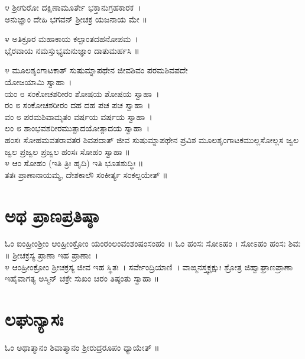 ೪ ಶ್ರೀಗುರೋ ದಕ್ಷಿಣಾಮೂರ್ತೇ ಭಕ್ತಾನುಗ್ರಹಕಾರಕ~।\\
ಅನುಜ್ಞಾಂ ದೇಹಿ ಭಗವನ್ ಶ್ರೀಚಕ್ರ ಯಜನಾಯ ಮೇ ॥

೪ ಅತಿಕ್ರೂರ ಮಹಾಕಾಯ ಕಲ್ಪಾಂತದಹನೋಪಮ~।\\
ಭೈರವಾಯ ನಮಸ್ತುಭ್ಯಮನುಜ್ಞಾಂ ದಾತುಮರ್ಹಸಿ ॥

೪ ಮೂಲಶೃಂಗಾಟಕಾತ್ ಸುಷುಮ್ನಾಪಥೇನ ಜೀವಶಿವಂ ಪರಮಶಿವಪದೇ \\ಯೋಜಯಾಮಿ ಸ್ವಾಹಾ~।\\
ಯಂ ೮ ಸಂಕೋಚಶರೀರಂ ಶೋಷಯ ಶೋಷಯ ಸ್ವಾಹಾ~।\\
ರಂ ೮ ಸಂಕೋಚಶರೀರಂ ದಹ ದಹ ಪಚ ಪಚ ಸ್ವಾಹಾ~।\\
ವಂ ೮ ಪರಮಶಿವಾಮೃತಂ ವರ್ಷಯ ವರ್ಷಯ ಸ್ವಾಹಾ~।\\
ಲಂ ೮ ಶಾಂಭವಶರೀರಮುತ್ಪಾದಯೋತ್ಪಾದಯ ಸ್ವಾಹಾ~।\\
ಹಂಸಃ ಸೋಹಮವತರಾವತರ ಶಿವಪದಾತ್ ಜೀವ ಸುಷುಮ್ನಾಪಥೇನ ಪ್ರವಿಶ ಮೂಲಶೃಂಗಾಟಕಮುಲ್ಲಸೋಲ್ಲಸ ಜ್ವಲ ಜ್ವಲ ಪ್ರಜ್ವಲ ಪ್ರಜ್ವಲ ಹಂಸಃ ಸೋಹಂ ಸ್ವಾಹಾ ॥\\
೪ ಆಂ ಸೋಹಂ (ಇತಿ ತ್ರಿಃ ಹೃದಿ) ಇತಿ ಭೂತಶುದ್ಧಿಃ ॥\\
ತತಃ ಪ್ರಾಣಾನಾಯಮ್ಯ, ದೇಶಕಾಲೌ ಸಂಕೀರ್ತ್ಯ ಸಂಕಲ್ಪಯೇತ್ ॥
\section{ಅಥ ಪ್ರಾಣಪ್ರತಿಷ್ಠಾ}
ಓಂ ಐಂಹ್ರೀಂಶ್ರೀಂ ಆಂಹ್ರೀಂಕ್ರೋಂ ಯಂರಂಲಂವಂಶಂಷಂಸಂಹಂ ॥ ಓಂ ಹಂಸಃ ಸೋಽಹಂ । ಸೋಽಹಂ ಹಂಸಃ ಶಿವಃ ॥ ಶ್ರೀಚಕ್ರಸ್ಯ  ಪ್ರಾಣಾ ಇಹ ಪ್ರಾಣಾಃ~।\\
೪ ಆಂಹ್ರೀಂಕ್ರೋಂ ಶ್ರೀಚಕ್ರಸ್ಯ ಜೀವ ಇಹ ಸ್ಥಿತಃ~। ಸರ್ವೇಂದ್ರಿಯಾಣಿ~। ವಾಙ್ಮನಸ್ತ್ವಕ್ಚಕ್ಷುಃ ಶ್ರೋತ್ರ ಜಿಹ್ವಾಘ್ರಾಣಪ್ರಾಣಾ ಇಹೈವಾಗತ್ಯ  ಅಸ್ಮಿನ್ ಚಕ್ರೇ ಸುಖಂ ಚಿರಂ ತಿಷ್ಠಂತು ಸ್ವಾಹಾ ॥
\section{ಲಘುನ್ಯಾಸಃ}
ಓಂ ಅಥಾತ್ಮಾನಂ ಶಿವಾತ್ಮಾನಂ ಶ್ರೀರುದ್ರರೂಪಂ ಧ್ಯಾಯೇತ್ ॥

